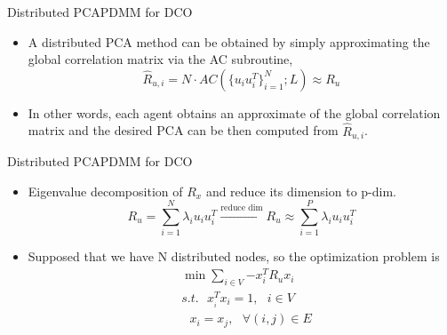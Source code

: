 \documentclass{beamer}
\begin{document}
\begin{frame}{Distributed PCA}{PDMM for DCO}
\begin{itemize}
\item{
A distributed PCA method can be obtained by simply approximating the global correlation
matrix via the AC subroutine,
\begin{equation}
{{\hat{R}}_{u,i}}=N\cdot AC(\{{{u}_{i}}u_{i}^{T}\}_{i=1}^{N};L)\approx {{R}_{u}}
\end{equation}
}
\item{
In other words, each agent obtains an approximate of the global correlation matrix and the desired PCA can be then computed from ${{\hat{R}}_{u,i}}$.

}
\end{itemize}
\end{frame}



\begin{frame}{Distributed PCA}{PDMM for DCO}
\begin{itemize}
\item{
Eigenvalue decomposition of ${{R}_{x}}$ and reduce its dimension to p-dim.
\begin{equation}
{{R}_{u}}=\sum\limits_{i=1}^{N}{{{\lambda }_{i}}{{u}_{i}}u_{i}^{T}}\xrightarrow{\text{reduce dim}}{{R}_{u}}\approx \sum\limits_{i=1}^{P}{{{\lambda }_{i}}{{u}_{i}}u_{i}^{T}}
\end{equation}
}
\item{
Supposed that we have N distributed nodes, so the optimization problem is 
\begin{equation}
\begin{align}
  & \min \sum\limits_{i\in V}{-x_{i}^{T}{{R}_{u}}{{x}_{i}}} \\ 
 & s.t.\text{ }x_{_{i}}^{T}{{x}_{i}}=1,\text{ }i\in V \\ 
 & \text{     }{{x}_{i}}={{x}_{j}},\text{ }\forall (i,j)\in E \\ 
\end{align}
\end{equation}
}
\end{itemize}
\end{frame}
\end{document}
